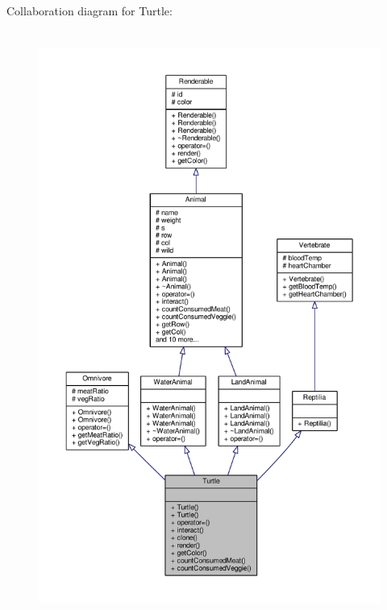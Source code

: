 Collaboration diagram for Turtle\+:
\nopagebreak
\begin{figure}[H]
\begin{center}
\leavevmode
\includegraphics[height=550pt]{classTurtle__coll__graph}
\end{center}
\end{figure}
